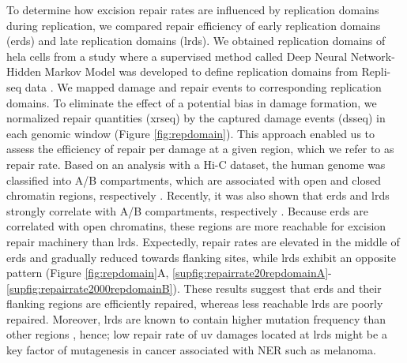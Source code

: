 To determine how excision repair rates are influenced by replication domains during replication, we compared repair efficiency of early replication domains (\gls{erd}s) and late replication domains (\gls{lrd}s). We obtained replication domains of \gls{hela} cells from a study where a supervised method called Deep Neural Network-Hidden Markov Model was developed to define replication domains from Repli-seq data \citep{liu2016novo}. We mapped damage and repair events to corresponding replication domains. To eliminate the effect of a potential bias in damage formation, we normalized repair quantities (\gls{xrseq}) by the captured damage events (\gls{dsseq}) in each genomic window (Figure \ref{fig:repdomain}). This approach enabled us to assess the efficiency of repair per damage at a given region, which we refer to as repair rate. Based on an analysis with a Hi-C dataset, the human genome was classified into A/B compartments, which are associated with open and closed chromatin regions, respectively \citep{lieberman2009comprehensive}. Recently, it was also shown that \gls{erd}s and \gls{lrd}s strongly correlate with A/B compartments, respectively \citep{pope2014topologically,ryba2010evolutionarily}. Because \gls{erd}s are correlated with open chromatins, these regions are more reachable for excision repair machinery than \gls{lrd}s. Expectedly, repair rates are elevated in the middle of \gls{erd}s and gradually reduced towards flanking sites, while \gls{lrd}s exhibit an opposite pattern (Figure \ref{fig:repdomain}A, \ref{supfig:repairrate20repdomainA}-\ref{supfig:repairrate2000repdomainB}). These results suggest that \gls{erd}s and their flanking regions are efficiently repaired, whereas less reachable \gls{lrd}s are poorly repaired. Moreover, \gls{lrd}s are known to contain higher mutation frequency than other regions \citep{lawrence2013mutational,stamatoyannopoulos2009human}, hence; low repair rate of \gls{uv} damages located at \gls{lrd}s might be a key factor of mutagenesis in cancer associated with NER such as melanoma. 

